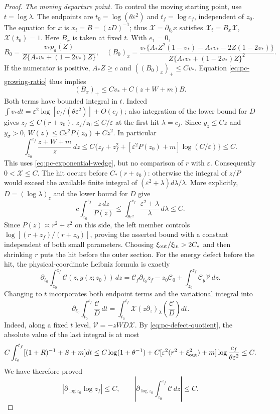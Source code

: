 \begin{proof}
\medskip\noindent\textit{The moving departure point.}\quad
To control the moving starting point, use $t=\log\lambda$. The
endpoints are $t_0=\log(\theta\varepsilon^2)$ and $t_f=\log c_f$,
independent of $z_0$. The equation for $x$ is $x_t=B=(zD)^{-1}$;
thus $\mathcal X=\partial_{\ell_0}x$ satisfies
$\mathcal X_t=B_x\mathcal X$, $\mathcal X(t_0)=1$.
Here $B_x$ is taken at fixed $t$. With $e_1=0$,
\[
 B_0=\frac{v_*p_a(Z)}{Z\{A_*v_*+(1-2v_*)Z\}},\quad
 (B_0)_x=
 \frac{v_*\{A_*Z^2(1-v_*)-A_*v_*-2Z(1-2v_*)\}}
 {Z\{A_*v_*+(1-2v_*)Z\}^2}.
\]
If the numerator is positive, $A_*Z\ge c$ and
$((B_0)_x)_+\le Cv_*$. Equation \eqref{eq:pc-growing-ratio} thus
implies
\[
 (B_x)_+\le Cv_*+C(z+W+m)B.
\]
Both terms have bounded integral in $t$. Indeed
$\int v_*dt=\varepsilon^2\log[c_f/(\theta\varepsilon^2)]+O(c_f)$;
also integration of the lower bound for $D$ gives
$z_f\le C(r+z_0)$, $z_f/z_0\le C/\varepsilon$ at the first hit
$\lambda=c_f$. Since $y_z\le Cz$ and $y_\sigma>0$,
$W(z)\le C\varepsilon^2P(z_0)+Cz^2$. In particular
\[
 \int_{z_0}^{z_f}\frac{z+W+m}{z}\,dz
 \le C\{z_f+z_f^2+
       [\varepsilon^2P(z_0)+m]\log(C/\varepsilon)\}\le C.
\]
This uses \eqref{eq:pc-exponential-wedge}, but no comparison of $r$
with $\varepsilon$. Consequently $0<\mathcal X\le C$.
The hit occurs before $C_*(r+z_0)$: otherwise the integral of $z/P$
would exceed the available finite integral of
$(\varepsilon^2+\lambda)d\lambda/\lambda$.  More explicitly,
$D=(\log\lambda)_z$ and the lower bound for $D$ give
\[
 c\int_{z_0}^{z_f}\frac{z\,dz}{P(z)}
 \le\int_{\theta\varepsilon^2}^{c_f}
           \frac{\varepsilon^2+\lambda}{\lambda}\,d\lambda
 \le C.
\]
Since $P(z)\asymp r^2+z^2$ on this side, the left member controls
$\log[(r+z_f)/(r+z_0)]$, proving the asserted bound with a constant
independent of both small parameters.
Choosing $\xi_{\rm out}/\xi_{\rm in}>2C_*$ and then shrinking $r$
puts the hit before the outer section. For the energy defect before
the hit, the physical-coordinate Leibniz formula is exactly
\[
 \partial_{\ell_0}\int_{z_0}^{z_f}\mathcal C(z,y(z;z_0))\,dz
 =\mathcal C_f\partial_{\ell_0}z_f-z_0\mathcal C_0
       +\int_{z_0}^{z_f}\mathcal C_y\mathcal V\,dz.
\]
Changing to $t$ incorporates both endpoint terms and the variational
integral into
\[
 \partial_{\ell_0}\int_{t_0}^{t_f}\frac{\mathcal C}{D}\,dt
 =\int_{t_0}^{t_f}\mathcal X
       (z\partial_z)_{\lambda}\left(\frac{\mathcal C}{D}\right)dt.
\]
Indeed, along a fixed $t$ level,
$\mathcal V=-zWD\mathcal X$. By \eqref{eq:pc-defect-quotient}, the
absolute value of the last integral is at most
\[
 C\int_{t_0}^{t_f}[(1+R)^{-1}+S+m]dt
 \le C\log(1+\theta^{-1})+
 C[\varepsilon^2(r^2+\xi_{\rm out}^2)+m]
       \log\frac{c_f}{\theta\varepsilon^2}\le C.
\]
We have therefore proved
\[
 |\partial_{\log z_0}\log z_f|\le C,\qquad
 \left|\partial_{\log z_0}\int_{z_0}^{z_f}\mathcal C\,dz\right|\le C.
\]


\end{proof}
